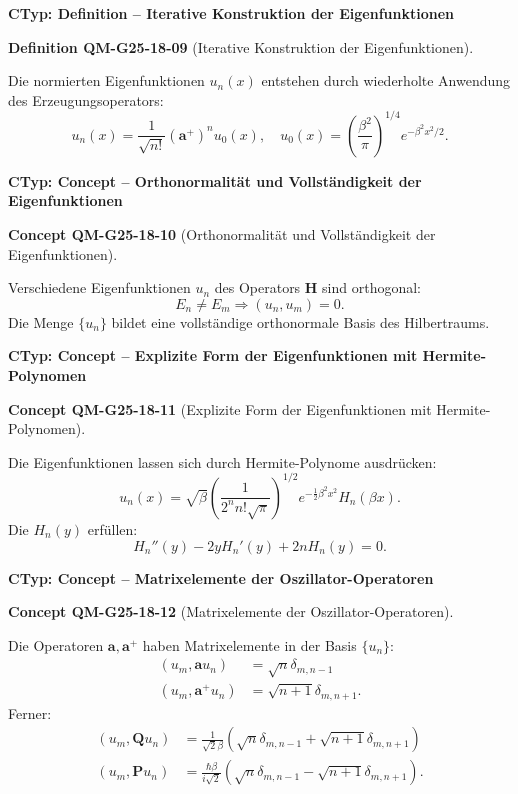 \documentclass[10pt, letterpaper]{article}
\newcommand{\CustomHeading}[3]{%
  \par\medskip\noindent%
  \textbf{#1 #2} \textnormal{(#3)}.\enskip%
}
\newenvironment{DEF}[2]{\begin{unitbox}\CustomHeading{Definition}{#1}{#2}}{\end{unitbox}}
\newenvironment{CONC}[2]{\begin{unitbox}\CustomHeading{Concept}{#1}{#2}}{\end{unitbox}}
\begin{document}
\textbf{CTyp: Definition – Iterative Konstruktion der Eigenfunktionen}

\begin{DEF}{QM-G25-18-09}{Iterative Konstruktion der Eigenfunktionen}
Die normierten Eigenfunktionen $u_n(x)$ entstehen durch wiederholte Anwendung des Erzeugungsoperators:
\[
u_n(x) = \frac{1}{\sqrt{n!}} (\mathbf{a}^+)^n u_0(x), \quad u_0(x) = \left( \frac{\beta^2}{\pi} \right)^{1/4} e^{-\beta^2 x^2/2}.
\]
\end{DEF}



\textbf{CTyp: Concept – Orthonormalität und Vollständigkeit der Eigenfunktionen}

\begin{CONC}{QM-G25-18-10}{Orthonormalität und Vollständigkeit der Eigenfunktionen}
Verschiedene Eigenfunktionen $u_n$ des Operators $\mathbf{H}$ sind orthogonal:
\[
E_n \neq E_m \Rightarrow (u_n, u_m) = 0.
\]
Die Menge $\{u_n\}$ bildet eine vollständige orthonormale Basis des Hilbertraums.
\end{CONC}



\textbf{CTyp: Concept – Explizite Form der Eigenfunktionen mit Hermite-Polynomen}

\begin{CONC}{QM-G25-18-11}{Explizite Form der Eigenfunktionen mit Hermite-Polynomen}
Die Eigenfunktionen lassen sich durch Hermite-Polynome ausdrücken:
\[
u_n(x) = \sqrt{\beta} \left( \frac{1}{2^n n! \sqrt{\pi}} \right)^{1/2} e^{-\frac{1}{2} \beta^2 x^2} H_n(\beta x).
\]
Die $H_n(y)$ erfüllen:
\[
H_n''(y) - 2y H_n'(y) + 2n H_n(y) = 0.
\]
\end{CONC}


\textbf{CTyp: Concept – Matrixelemente der Oszillator-Operatoren}

\begin{CONC}{QM-G25-18-12}{Matrixelemente der Oszillator-Operatoren}
Die Operatoren $\mathbf{a}, \mathbf{a}^+$ haben Matrixelemente in der Basis $\{u_n\}$:
\[
\begin{aligned}
(u_m, \mathbf{a} u_n) &= \sqrt{n} \delta_{m,n-1} \\
(u_m, \mathbf{a}^+ u_n) &= \sqrt{n+1} \delta_{m,n+1}.
\end{aligned}
\]
Ferner:
\[
\begin{aligned}
(u_m, \mathbf{Q} u_n) &= \frac{1}{\sqrt{2}\beta} \left( \sqrt{n} \delta_{m,n-1} + \sqrt{n+1} \delta_{m,n+1} \right) \\
(u_m, \mathbf{P} u_n) &= \frac{\hbar\beta}{i\sqrt{2}} \left( \sqrt{n} \delta_{m,n-1} - \sqrt{n+1} \delta_{m,n+1} \right).
\end{aligned}
\]
\end{CONC}
\end{document}
